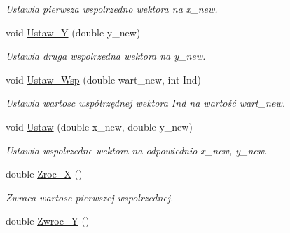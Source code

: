 \begin{DoxyCompactItemize}
\begin{DoxyCompactList}\small\item\em Ustawia pierwsza wspolrzedno wektora na x\+\_\+new. \end{DoxyCompactList}\item 
\hypertarget{class_wektor2_d_aa94255dc07581b89f76145869d8619db}{void \hyperlink{class_wektor2_d_aa94255dc07581b89f76145869d8619db}{Ustaw\+\_\+\+Y} (double y\+\_\+new)}\label{class_wektor2_d_aa94255dc07581b89f76145869d8619db}

\begin{DoxyCompactList}\small\item\em Ustawia druga wspolrzedna wektora na y\+\_\+new. \end{DoxyCompactList}\item 
void \hyperlink{class_wektor2_d_a9b3a4e9dc8e3697fbca786faf029c6c1}{Ustaw\+\_\+\+Wsp} (double wart\+\_\+new, int Ind)
\begin{DoxyCompactList}\small\item\em Ustawia wartosc współrzędnej wektora Ind na wartość wart\+\_\+new. \end{DoxyCompactList}\item 
\hypertarget{class_wektor2_d_a33026b3a205d6e3f66c25c2e6e241a71}{void \hyperlink{class_wektor2_d_a33026b3a205d6e3f66c25c2e6e241a71}{Ustaw} (double x\+\_\+new, double y\+\_\+new)}\label{class_wektor2_d_a33026b3a205d6e3f66c25c2e6e241a71}

\begin{DoxyCompactList}\small\item\em Ustawia wspolrzedne wektora na odpowiednio x\+\_\+new, y\+\_\+new. \end{DoxyCompactList}\item 
\hypertarget{class_wektor2_d_aa52f09def60840859082e2c8728928f7}{double \hyperlink{class_wektor2_d_aa52f09def60840859082e2c8728928f7}{Zroc\+\_\+\+X} ()}\label{class_wektor2_d_aa52f09def60840859082e2c8728928f7}

\begin{DoxyCompactList}\small\item\em Zwraca wartosc pierwszej wspolrzednej. \end{DoxyCompactList}\item 
\hypertarget{class_wektor2_d_ad87d085bf5865039317476080b3cda69}{double \hyperlink{class_wektor2_d_ad87d085bf5865039317476080b3cda69}{Zwroc\+\_\+\+Y} ()}\label{class_wektor2_d_ad87d085bf5865039317476080b3cda69}


\end{DoxyCompactItemize}
